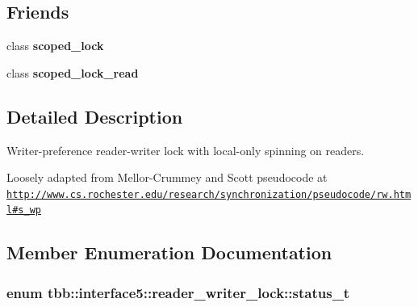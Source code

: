 \subsection*{Friends}
\begin{DoxyCompactItemize}
\item 
\hypertarget{classtbb_1_1interface5_1_1reader__writer__lock_afcf922650b2fd9d76b7b939d8511bbd8}{}class {\bfseries scoped\+\_\+lock}\label{classtbb_1_1interface5_1_1reader__writer__lock_afcf922650b2fd9d76b7b939d8511bbd8}

\item 
\hypertarget{classtbb_1_1interface5_1_1reader__writer__lock_a578ccbc6ecbc6d32cb45ccfdc0ed4ee6}{}class {\bfseries scoped\+\_\+lock\+\_\+read}\label{classtbb_1_1interface5_1_1reader__writer__lock_a578ccbc6ecbc6d32cb45ccfdc0ed4ee6}

\end{DoxyCompactItemize}


\subsection{Detailed Description}
Writer-\/preference reader-\/writer lock with local-\/only spinning on readers. 

Loosely adapted from Mellor-\/\+Crummey and Scott pseudocode at \href{http://www.cs.rochester.edu/research/synchronization/pseudocode/rw.html#s_wp}{\tt http\+://www.\+cs.\+rochester.\+edu/research/synchronization/pseudocode/rw.\+html\#s\+\_\+wp} 

\subsection{Member Enumeration Documentation}
\hypertarget{classtbb_1_1interface5_1_1reader__writer__lock_a29bbf9ca21c12b313d9fa5326feaf3ed}{}
\subsubsection[{status\+\_\+t}]{\setlength{\rightskip}{0pt plus 5cm}enum {\bf tbb\+::interface5\+::reader\+\_\+writer\+\_\+lock\+::status\+\_\+t}}\label{classtbb_1_1interface5_1_1reader__writer__lock_a29bbf9ca21c12b313d9fa5326feaf3ed}


